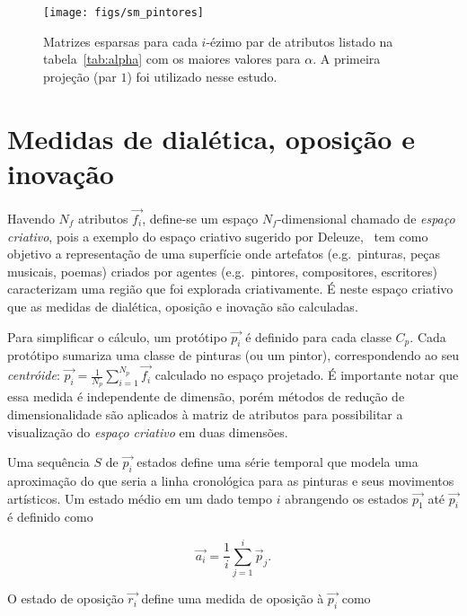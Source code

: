 \begin{figure}[h!]
\begin{center}
      \caption{Matrizes esparsas para cada $i$-ézimo par de atributos listado na
        tabela~\ref{tab:alpha} com os maiores valores para $\alpha$. A primeira
        projeção (par $1$) foi utilizado nesse estudo.}
        \label{fig:scatters}
        \end{center}
{    \centering
        \texttt{[image: figs/sm\_pintores]}}
        \fonteminha
\end{figure}

\section{Medidas de dialética, oposição e inovação}
\label{sec:medidas}

Havendo $N_f$ atributos $\vec{f_i}$, define-se um espaço
$N_f$-dimensional chamado de \textit{espaço criativo}, pois a exemplo
do espaço criativo sugerido por Deleuze,~\cite{deleuze} tem como
objetivo a representação de uma superfície onde artefatos
(e.g.\ pinturas, peças musicais, poemas) criados por agentes
(e.g.\ pintores, compositores, escritores) caracterizam uma região que
foi explorada criativamente. É neste espaço criativo que as medidas de
dialética, oposição e inovação são calculadas.~\cite{vieira}

Para simplificar o cálculo, um protótipo $\vec{p_i}$ é definido para cada classe
$C_p$. Cada protótipo sumariza uma classe de pinturas (ou um pintor),
correspondendo ao seu \textit{centróide}: $\vec{p_i} = \frac{1}{N_p}
\sum_{i=1}^{N_p} \vec{f_i}$ calculado no espaço projetado. É importante notar
que essa medida é independente de dimensão, porém métodos de redução de
dimensionalidade são aplicados à matriz de atributos para possibilitar a
visualização do \textit{espaço criativo} em duas dimensões.

Uma sequência $S$ de $\vec{p_i}$ estados define uma série temporal que
modela uma aproximação do que seria a linha cronológica para as
pinturas e seus movimentos artísticos. Um estado médio em um dado
tempo $i$ abrangendo os estados $\vec{p_1}$ até $\vec{p_i}$ é definido
como

\begin{equation}
\vec{a_i} = \frac{1}{i}\sum_{j=1}^i\vec{p}_j.
\end{equation}

O estado de oposição $\vec{r_i}$ define uma medida de oposição à $\vec{p_i}$ como

